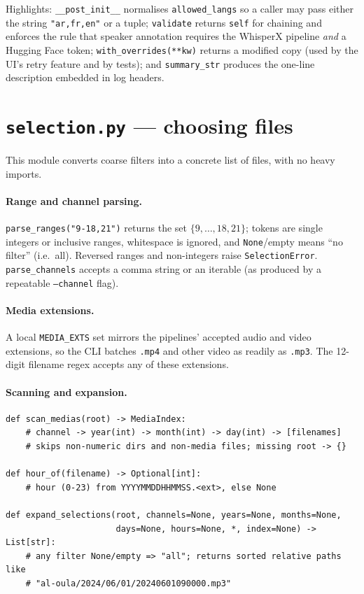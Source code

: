 \documentclass[11pt,a4paper]{report}
\newcommand{\code}[1]{\texttt{\small #1}}
\begin{document}
Highlights: \code{\_\_post\_init\_\_} normalises \code{allowed\_langs} so a caller
may pass either the string \code{"ar,fr,en"} or a tuple; \code{validate} returns
\code{self} for chaining and enforces the rule that speaker annotation requires
the WhisperX pipeline \emph{and} a Hugging Face token; \code{with\_overrides(**kw)}
returns a modified copy (used by the UI's retry feature and by tests); and
\code{summary\_str} produces the one-line description embedded in log headers.

\section{\texttt{selection.py} --- choosing files}

This module converts coarse filters into a concrete list of files, with no heavy
imports.

\paragraph{Range and channel parsing.} \code{parse\_ranges("9-18,21")} returns the
set $\{9,\dots,18,21\}$; tokens are single integers or inclusive ranges, whitespace
is ignored, and \code{None}/empty means ``no filter'' (i.e.\ all). Reversed ranges
and non-integers raise \code{SelectionError}. \code{parse\_channels} accepts a
comma string or an iterable (as produced by a repeatable \code{--channel} flag).

\paragraph{Media extensions.} A local \code{MEDIA\_EXTS} set mirrors the pipelines'
accepted audio and video extensions, so the CLI batches \code{.mp4} and other
video as readily as \code{.mp3}. The 12-digit filename regex accepts any of these
extensions.

\paragraph{Scanning and expansion.}

\begin{lstlisting}[caption={Selection API.}]
def scan_medias(root) -> MediaIndex:
    # channel -> year(int) -> month(int) -> day(int) -> [filenames]
    # skips non-numeric dirs and non-media files; missing root -> {}

def hour_of(filename) -> Optional[int]:
    # hour (0-23) from YYYYMMDDHHMMSS.<ext>, else None

def expand_selections(root, channels=None, years=None, months=None,
                      days=None, hours=None, *, index=None) -> List[str]:
    # any filter None/empty => "all"; returns sorted relative paths like
    # "al-oula/2024/06/01/20240601090000.mp3"
\end{lstlisting}
\end{document}
